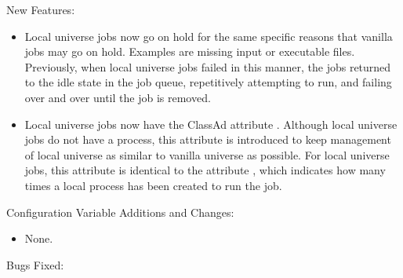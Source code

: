 \noindent New Features:

\begin{itemize}

\item Local universe jobs now go on hold for the same specific reasons that
vanilla jobs may go on hold.  Examples are missing input or executable files.
Previously, when local universe jobs failed in this manner,
the jobs returned to the idle state in the job queue,
repetitively attempting to run, 
and failing over and over until the job is removed.

\item Local universe jobs now have the ClassAd attribute .
Although local universe jobs do not have a  process, 
this attribute
is introduced to keep management of local universe as similar to
vanilla universe as possible.  For local universe jobs, this attribute
is identical to the attribute , 
which indicates how many times a
local  process has been created to run the job.

\end{itemize}

\noindent Configuration Variable Additions and Changes:

\begin{itemize}

\item None.

\end{itemize}

\noindent Bugs Fixed:

